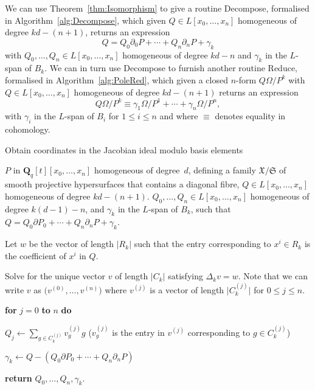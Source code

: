 \documentclass[a4paper,11pt]{article}
\numberwithin{equation}{section}
\providecommand{\abs}[1]{\lvert#1\rvert}                 %
\newcommand{\QQ}{\mathbf{Q}} %
\theoremstyle{definition}
\begin{document}
We can use Theorem~\ref{thm:Isomorphism} to give a routine {\sc Decompose}, 
formalised in Algorithm~\ref{alg:Decompose}, which given 
$Q \in L[x_0, \dotsc, x_n]$ homogeneous of degree $kd - (n+1)$, 
returns an expression 
\begin{equation}
Q = Q_0 \partial_0 P + \dotsb + Q_n \partial_n P + \gamma_k
\end{equation} 
with $Q_0, \dotsc, Q_n \in L[x_0, \dotsc, x_n]$ homogeneous of 
degree $kd-n$ and $\gamma_k$ in the $L$-span of $B_k$. We can in turn 
use {\sc Decompose} to furnish another routine {\sc Reduce}, formalised 
in Algorithm~\ref{alg:PoleRed}, which given a closed $n$-form $Q\Omega/P^k$ 
with $Q \in L[x_0, \dotsc, x_n]$ homogeneous of degree $kd - (n+1)$ returns 
an expression
\begin{equation}
Q \Omega / P^k \equiv \gamma_{1} \Omega / P^{1} + \dotsb + \gamma_n \Omega / P^n,
\end{equation}
with $\gamma_i$ in the $L$-span of $B_i$ for $1 \leq i \leq n$ and 
where $\equiv$ denotes equality in cohomology.


\begin{algorithm}
\caption{Obtain coordinates in the Jacobian ideal modulo basis elements}
\label{alg:Decompose}
\begin{algorithmic}
\Require  $P$ in $\QQ_q[t][x_0, \dotsc, x_n]$ homogeneous of degree~$d$, 
         defining a family $\mathfrak{X}/\mathfrak{S}$ of smooth projective 
         hypersurfaces that contains a diagonal fibre, $Q \in L[x_0, \dotsc, x_n]$ homogeneous of degree $kd - (n+1)$.
\Ensure  $Q_0, \dotsc, Q_n \in L[x_0, \dotsc, x_n]$ homogeneous of degree 
         $k(d-1)-n$, and $\gamma_k$ in the $L$-span of $B_k$, such that 
         $Q = Q_0 \partial P_0 + \dotsb + Q_n \partial_n P +\gamma_k$.
\State \begin{compactenum}[{\hspace{1em}} 1.] \vspace{-1.24em}
\item Let $w$ be the vector of length $\abs{R_k}$ such that the entry 
      corresponding to $x^i \in R_k$ is the coefficient of 
      $x^i$ in $Q$.
\item Solve for the unique vector $v$ of length $\abs{C_k}$ satisfying 
      $\Delta_k v = w$.  Note that we can write $v$ 
      as $\bigl(v^{(0)}, \dotsc, v^{(n)}\bigr)$ 
      where $v^{(j)}$ is a vector of length $\abs{C_k^{(j)}}$ 
      for $0 \leq j \leq n$.
\item \textbf{for} $j=0$ \textbf{to} $n$ \textbf{do} 
\item[] \hspace{1em} $Q_j \gets \sum_{g \in C_k^{(j)}} v_g^{(j)} g$ ($v_g^{(j)}$ is the entry in $v^{(j)}$ corresponding to $g \in C_k^{(j)}$)
\item[] $\gamma_k \gets Q-(Q_0 \partial P_0 + \dotsb + Q_n \partial_n P)$
\item \textbf{return} $Q_0, \dotsc, Q_n,\gamma_k$.
\EndProcedure
\end{compactenum}
\end{algorithmic}
\end{algorithm}
\end{document}
